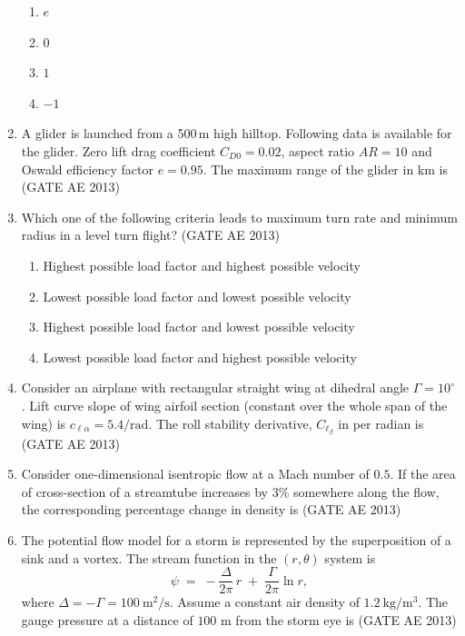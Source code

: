 \documentclass[journal,12pt,onecolumn]{IEEEtran}
\theoremstyle{remark}
\begin{document}
\begin{flushleft}
\begin{enumerate}
\begin{multicols}{2}
\begin{enumerate}
    \item $e$  
    \item $0$  
    \item $1$  
    \item $-1$  
\end{enumerate}
\end{multicols}

\item A glider is launched from a 500\,m high hilltop. Following data is available for the glider. Zero lift drag coefficient $C_{D0}=0.02$, aspect ratio $AR=10$ and Oswald efficiency factor $e=0.95$. The maximum range of the glider in km is \underline{\hspace{3cm}} 
\hfill(GATE AE 2013)

\item Which one of the following criteria leads to maximum turn rate and minimum radius in a level turn flight? 
\hfill(GATE AE 2013)

\begin{enumerate}
  \item Highest possible load factor and highest possible velocity
  \item Lowest possible load factor and lowest possible velocity
  \item Highest possible load factor and lowest possible velocity
  \item Lowest possible load factor and highest possible velocity
\end{enumerate}

\item Consider an airplane with rectangular straight wing at dihedral angle $\Gamma=10^\circ$. Lift curve slope of wing airfoil section (constant over the whole span of the wing) is $c_{\ell\alpha}=5.4/\mathrm{rad}$. The roll stability derivative, $C_{\ell_\beta}$ in per radian is \underline{\hspace{3cm}} 
\hfill(GATE AE 2013)

\item Consider one-dimensional isentropic flow at a Mach number of $0.5$. If the area of cross-section of a streamtube increases by $3\%$ somewhere along the flow, the corresponding percentage change in density is \underline{\hspace{3cm}} 
\hfill(GATE AE 2013)

\item The potential flow model for a storm is represented by the superposition of a sink and a vortex. The stream function in the $(r,\theta)$ system is
\[
\psi \;=\; -\frac{\Delta}{2\pi}\,r \;+\; \frac{\Gamma}{2\pi}\ln r ,
\]
where $\Delta=-\Gamma=100~\mathrm{m^2/s}$. Assume a constant air density of $1.2~\mathrm{kg/m^3}$. The gauge pressure at a distance of $100$ m from the storm eye is
\hfill(GATE AE 2013)


\end{enumerate}
\end{flushleft}
\end{document}
